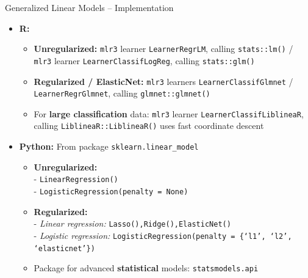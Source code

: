 \begin{frame}{Generalized Linear Models -- Implementation}


\begin{itemize}
  \item \textbf{R:}
  \begin{itemize}
    \item \textbf{Unregularized:} \texttt{mlr3} learner \texttt{LearnerRegrLM}, 
    calling \texttt{stats::lm()} / \texttt{mlr3} learner 
    \texttt{LearnerClassifLogReg}, calling \texttt{stats::glm()}
    \item \textbf{Regularized / ElasticNet:} \texttt{mlr3} learners 
    \texttt{LearnerClassifGlmnet} / 
    \texttt{LearnerRegrGlmnet}, calling \texttt{glmnet::glmnet()}
    \item For \textbf{large classification} data: \texttt{mlr3} learner     
    \texttt{LearnerClassifLiblineaR}, calling \texttt{LiblineaR::LiblineaR()} uses fast coordinate descent
  \end{itemize}
  \item \textbf{Python:} From package \texttt{sklearn.linear\_model} 
  \begin{itemize}
    \item \textbf{Unregularized:}\\ 
    - \texttt{LinearRegression()}\\
    - \texttt{LogisticRegression(penalty = None)}
    \item \textbf{Regularized:}\\
    - \textit{Linear regression:} \texttt{Lasso(),Ridge(),ElasticNet()} \\
    - \textit{Logistic regression:} \texttt{LogisticRegression(penalty = \{‘l1’, ‘l2’, ‘elasticnet’\})}
    \item Package for advanced \textbf{statistical} models: \texttt{statsmodels.api} 
  \end{itemize}
\end{itemize}


\end{frame}


